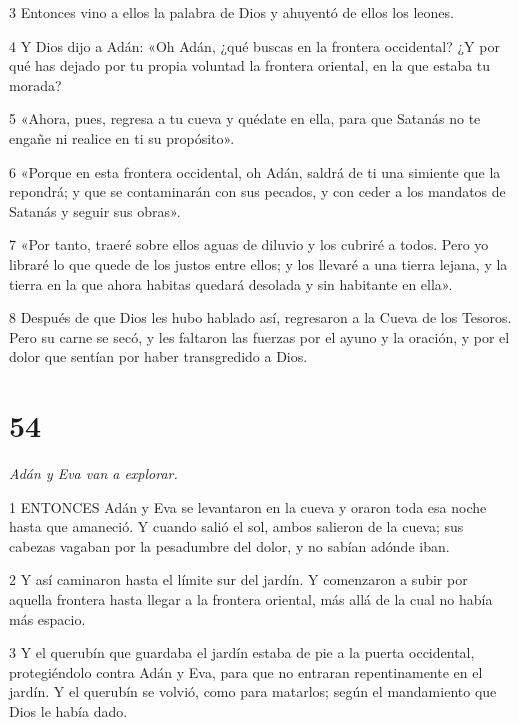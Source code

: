 \par 3 Entonces vino a ellos la palabra de Dios y ahuyentó de ellos los leones.

\par 4 Y Dios dijo a Adán: «Oh Adán, ¿qué buscas en la frontera occidental? ¿Y por qué has dejado por tu propia voluntad la frontera oriental, en la que estaba tu morada?

\par 5 «Ahora, pues, regresa a tu cueva y quédate en ella, para que Satanás no te engañe ni realice en ti su propósito».

\par 6 «Porque en esta frontera occidental, oh Adán, saldrá de ti una simiente que la repondrá; y que se contaminarán con sus pecados, y con ceder a los mandatos de Satanás y seguir sus obras».

\par 7 «Por tanto, traeré sobre ellos aguas de diluvio y los cubriré a todos. Pero yo libraré lo que quede de los justos entre ellos; y los llevaré a una tierra lejana, y la tierra en la que ahora habitas quedará desolada y sin habitante en ella».

\par 8 Después de que Dios les hubo hablado así, regresaron a la Cueva de los Tesoros. Pero su carne se secó, y les faltaron las fuerzas por el ayuno y la oración, y por el dolor que sentían por haber transgredido a Dios.

\chapter{54}

\par \textit{Adán y Eva van a explorar.}

\par 1 ENTONCES Adán y Eva se levantaron en la cueva y oraron toda esa noche hasta que amaneció. Y cuando salió el sol, ambos salieron de la cueva; sus cabezas vagaban por la pesadumbre del dolor, y no sabían adónde iban.

\par 2 Y así caminaron hasta el límite sur del jardín. Y comenzaron a subir por aquella frontera hasta llegar a la frontera oriental, más allá de la cual no había más espacio.

\par 3 Y el querubín que guardaba el jardín estaba de pie a la puerta occidental, protegiéndolo contra Adán y Eva, para que no entraran repentinamente en el jardín. Y el querubín se volvió, como para matarlos; según el mandamiento que Dios le había dado.


